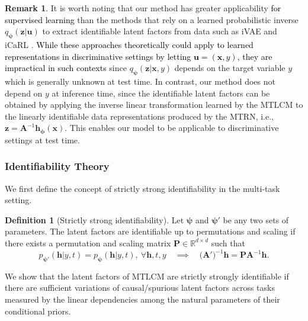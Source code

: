 \documentclass[10pt]{article} %
\theoremstyle{plain}
\theoremstyle{definition}
\newtheorem{definition}[theorem]{Definition}
\newtheorem{remark}[theorem]{Remark}
\begin{document}
\begin{remark}
    It is worth noting that our method has greater applicability \textcolor{black}{for supervised learning} than the methods that rely on a learned probabilistic inverse $q_{\boldsymbol{\psi}}(\mathbf{z}|\mathbf{u})$ to extract identifiable latent factors from data such as iVAE \citep{Khemakhem_Kingma_Monti_Hyvarinen_2020} and iCaRL \citep{Lu_Wu_Hernandez-Lobato_Scholkopf_2022}. \textcolor{black}{While these approaches theoretically could apply to learned representations in discriminative settings by letting $\mathbf{u} = (\mathbf{x}, y)$, they are impractical in such contexts} since $q_{\boldsymbol{\psi}}(\mathbf{z}|\mathbf{x},y)$ depends on the target variable $y$ which is generally unknown at test time. In contrast, our method does not depend on $y$ at inference time, since the identifiable latent factors can be obtained by applying the inverse linear transformation learned by the MTLCM to the linearly identifiable data representations produced by the MTRN, i.e., $\mathbf{z}=\mathbf{A}^{-1}\mathbf{h}_{\boldsymbol{\phi}}(\mathbf{x})$. This enables our model to be applicable to discriminative settings at test time.
\end{remark}

\subsubsection{Identifiability Theory}
We first define the concept of strictly strong identifiability in the multi-task setting.
\begin{definition}[Strictly strong identifiability]\label{def:strong-id}
    Let $\boldsymbol{\psi}$ and $\boldsymbol{\psi}'$ be any two sets of parameters. The latent factors are identifiable up to permutations and scaling if there exists a permutation and scaling matrix $\mathbf{P}\in\mathbb{R}^{d\times d}$ 
    such that 
    \begin{equation}\label{eq:strong-id}
            p_{\boldsymbol{\psi}'}(\mathbf{h}|y,t)=p_{\boldsymbol{\psi}}(\mathbf{h}|y,t),~\forall \mathbf{h},t,y
            \quad\implies\quad
        (\mathbf{A')}^{-1}\mathbf{h}=\mathbf{P}\mathbf{A}^{-1}\mathbf{h}.
    \end{equation}
\end{definition}

We show that the latent factors of MTLCM are  strictly strongly identifiable if there are sufficient variations of causal/spurious latent factors across tasks measured by the linear dependencies among the natural parameters of their conditional priors.
\end{document}
